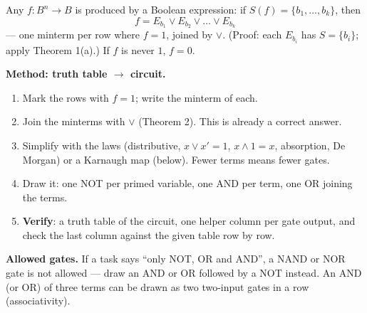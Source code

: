 \documentclass{fkt-notes}
\theoremstyle{definition}
\begin{document}
\begin{rulebox}[title={6.6 Theorem 2: every Boolean function has an expression}]
  Any $f:B^n\to B$ is produced by a Boolean expression: if
  $S(f)=\{b_1,\dots,b_k\}$, then
  \[
    f=E_{b_1}\vee E_{b_2}\vee\dots\vee E_{b_k}
  \]
  --- one minterm per row where $f=1$, joined by $\vee$. (Proof: each
  $E_{b_i}$ has $S=\{b_i\}$; apply Theorem 1(a).) If $f$ is never $1$,
  $f=0$.
\end{rulebox}

\begin{rulepar}
  \textbf{Method: truth table $\to$ circuit.}
  \begin{enumerate}[nosep]
    \item Mark the rows with $f=1$; write the minterm of each.
    \item Join the minterms with $\vee$ (Theorem 2). This is already a
          correct answer.
    \item Simplify with the laws (distributive, $x\vee x'=1$,
          $x\wedge1=x$, absorption, De Morgan) or a Karnaugh map (below).
          Fewer terms means fewer gates.
    \item Draw it: one NOT per primed variable, one AND per term, one OR
          joining the terms.
    \item \textbf{Verify}: a truth table of the circuit, one helper
          column per gate output, and check the last column against the
          given table row by row.
  \end{enumerate}
\end{rulepar}
\textbf{Allowed gates.} If a task says ``only NOT, OR and AND'', a NAND
or NOR gate is not allowed --- draw an AND or OR followed by a NOT
instead. An AND (or OR) of three terms can be drawn as two two-input
gates in a row (associativity).
\end{document}
